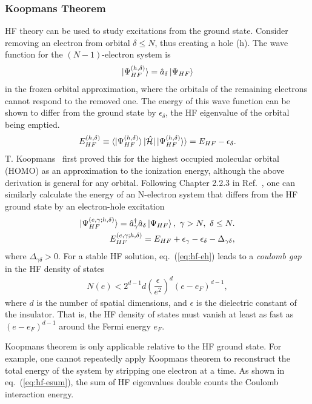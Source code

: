 \subsubsection{Koopmans Theorem}
HF theory can be used to study excitations from the ground state. Consider removing an electron from orbital $\delta\le N$, thus creating a hole (h). The wave function for the $(N-1)$-electron system is~\cite{Giuliani2005}
\begin{align}
\ket{\Psi_{HF}^{(h,\delta)}} = \hat{a}_\delta\ket{\Psi_{HF}}
\end{align}
in the frozen orbital approximation, where the orbitals of the remaining electrons cannot respond to the removed one. The energy of this wave function can be shown to differ from the ground state by $\epsilon_\delta$, the HF eigenvalue of the orbital being emptied.
\begin{align}
E_{HF}^{(h,\delta)} \equiv \braket{\ket{\Psi_{HF}^{(h,\delta)}}|\hat{\mathcal{H}}|\ket{\Psi_{HF}^{(h,\delta)}}} = E_{HF} - \epsilon_\delta.
\end{align}
T. Koopmans~\cite{Koopmans1934} first proved this for the highest occupied molecular orbital (HOMO) as an approximation to the ionization energy, although the above derivation is general for any orbital.
Following Chapter 2.2.3 in Ref.~\cite{Giuliani2005}, one can similarly calculate the energy of an N-electron system that differs from the HF ground state by an electron-hole excitation
\begin{align}
\ket{\Psi_{HF}^{(e,\gamma;h,\delta)}} = \hat{a}_\gamma^\dagger \hat{a}_\delta \ket{\Psi_{HF}}, ~\gamma>N,~\delta\le N. \\
E_{HF}^{(e,\gamma;h,\delta)} = E_{HF}+\epsilon_\gamma-\epsilon_\delta-\Delta_{\gamma\delta},
\label{eq:hf-eh}
\end{align}
where $\Delta_{\gamma\delta}>0$. For a stable HF solution, eq.~(\ref{eq:hf-eh}) leads to a \textit{coulomb gap} in the HF density of states
\begin{align}
N(e) < 2^{d-1}d\left(\dfrac{\epsilon}{e^2}\right)^d(e-e_F)^{d-1},
\end{align}
where $d$ is the number of spatial dimensions, and $\epsilon$ is the dielectric constant of the insulator. That is, the HF density of states must vanish at least as fast as $(e-e_F)^{d-1}$ around the Fermi energy $e_F$.

Koopmans theorem  is only applicable relative to the HF ground state. For example, one cannot repeatedly apply Koopmans theorem to reconstruct the total energy of the system by stripping one electron at a time. As shown in eq.~(\ref{eq:hf-esum}), the sum of HF eigenvalues double counts the Coulomb interaction energy.%

